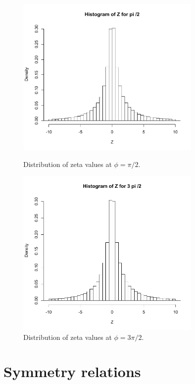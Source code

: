 \documentclass[twoside]{article}
\theoremstyle{definition}
\begin{document}
\begin{figure}
\centering
\includegraphics[width=0.8\textwidth]{pi2plot.pdf}
\caption[]{ 
 Distribution of zeta values at $\phi = \pi/2$.
  }
\vspace{1mm}
\label{pi2}
\includegraphics[width=0.8\textwidth]{3pi2plot.pdf}
\caption[]{ 
 Distribution of zeta values at $\phi = 3\pi/2$.
  }
\vspace{1mm}
\label{3pi2}
\end{figure}



\section{\label{sec7}Symmetry relations}
\end{document}
